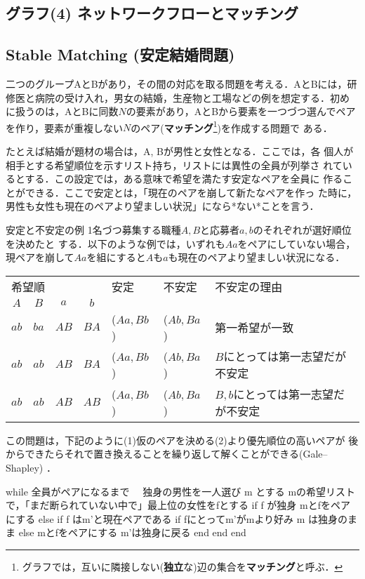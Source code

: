  \begin{versionalpha}
\chapter{グラフ(4) ネットワークフローとマッチング}

\section{Stable Matching (安定結婚問題)}

二つのグループAとBがあり，その間の対応を取る問題を考える．AとBには，研
修医と病院の受け入れ，男女の結婚，生産物と工場などの例を想定する．初め
に扱うのは，AとBに同数$N$の要素があり，AとBから要素を一つづつ選んでペア
を作り，要素が重複しない$N$のペア(\textbf{マッチング}\footnote{グラフでは，互いに隣接しない(\textbf{独立}な)辺の集合を\textbf{マッチング}と呼ぶ．})を作成する問題で
ある．

たとえば結婚が題材の場合は，A, Bが男性と女性となる．ここでは，各
個人が相手とする希望順位を示すリスト持ち，リストには異性の全員が列挙さ
れているとする．この設定では，ある意味で希望を満たす安定なペアを全員に
作ることができる．ここで安定とは，「現在のペアを崩して新たなペアを作っ
た時に，男性も女性も現在のペアより望ましい状況」になら*ない*ことを言う．

\begin{itembox}{安定と不安定の例}
  1名づつ募集する職種$A,B$と応募者$a,b$のそれぞれが選好順位を決めたと
  する．以下のような例では，いずれも$Aa$をペアにしていない場合，現ペアを崩して$Aa$を組にすると$A$も$a$も現在のペアより望ましい状況になる．

  \begin{center}
  \begin{tabular}{cccc|lll}
    \multicolumn{4}{l|}{希望順} & 安定 & 不安定 &不安定の理由\\
    $A$ & $B$ & $a$ & $b$ \\\hline
    $ab$&  $ba$& $AB$& $BA$   & ($Aa, Bb$) & ($Ab, Ba$) & 第一希望が一致\\
    $ab$&  $ab$& $AB$& $BA$   & ($Aa, Bb$) & ($Ab, Ba$)
    & $B$にとっては第一志望だが不安定\\
    $ab$&  $ab$& $AB$& $AB$   & ($Aa, Bb$) & ($Ab, Ba$)& $B, b$にとっては第一志望だが不安定
  \end{tabular}
  \end{center}
\end{itembox}

この問題は，下記のように(1)仮のペアを決める(2)より優先順位の高いペアが
後からできたらそれで置き換えることを繰り返して解くことができる(Gale–Shapley)
．
\begin{cbox}
while 全員がペアになるまで
　独身の男性を一人選び m とする
  mの希望リストで，「まだ断られていない中で」最上位の女性をfとする
  if f が独身
    mとfをペアにする
  else if f はm'と現在ペアである
    if fにとってm'がmより好み
      m は独身のまま
    else
      mとfをペアにする
      m'は独身に戻る
    end
  end
end  
\end{cbox}


\end{versionalpha}
